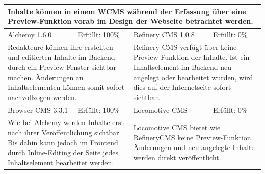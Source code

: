 \begin{tabular}[!ht]{|l|l|l|l|}
\hline
\multicolumn{4}{|p{15cm}|}{\textbf{Inhalte können in einem WCMS während der Erfassung über eine Preview-Funktion vorab im Design der Webseite betrachtet werden.}} \\
\hline
  Alchemy 1.6.0 & \cellcolor{green}Erfüllt: 100\% & Refinery CMS 1.0.8 & \cellcolor{red}Erfüllt: 0\% \\
  \hline
  \multicolumn{2}{|p{7.5cm}|}{Redakteure können ihre erstellten und editierten Inhalte im Backend durch ein Preview-Fenster sichtbar machen. Änderungen an Inhaltselementen können somit sofort nachvollzogen werden.}
   & \multicolumn{2}{p{7.5cm}|}{Refinery CMS verfügt über keine Preview-Funktion der Inhalte. Ist ein Inhaltselement im Backend neu angelegt oder bearbeitet wurden, wird dies auf der Internetseite sofort sichtbar.} \\
  \hline
  Browser CMS 3.3.1 & \cellcolor{green}Erfüllt: 100\% & Locomotive CMS & \cellcolor{red}Erfüllt: 0\% \\
  \hline
  \multicolumn{2}{|p{7.5cm}|}{Wie bei Alchemy werden Inhalte erst nach ihrer Veröffentlichung sichtbar. Bis dahin kann jedoch im Frontend durch Inline-Editing der Seite jedes Inhaltselement bearbeitet werden.} & \multicolumn{2}{p{7.5cm}|}{Locomotive CMS bietet wie RefineryCMS keine Preview-Funktion. Änderungen und neu angelegte Inhalte werden direkt veröffentlicht.} \\
\hline
\end{tabular}
\newline
\newline
\newline
